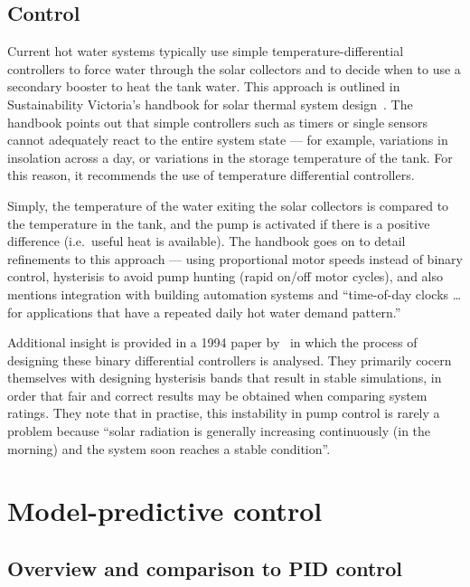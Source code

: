 
\subsection{Control}

Current hot water systems typically use simple temperature-differential controllers to force water through the solar collectors and to decide when to use a secondary booster to heat the tank water.
This approach is outlined in Sustainability Victoria's handbook for solar thermal system design~\cite{LSTS}.
The handbook points out that simple controllers such as timers or single sensors cannot adequately react to the entire system state --- for example, variations in insolation across a day, or variations in the storage temperature of the tank.
For this reason, it recommends the use of temperature differential controllers.

Simply, the temperature of the water exiting the solar collectors is compared to the temperature in the tank, and the pump is activated if there is a positive difference (i.e.\ useful heat is available).
The handbook goes on to detail refinements to this approach --- using proportional motor speeds instead of binary control, hysterisis to avoid pump hunting (rapid on/off motor cycles), and also mentions integration with building automation systems and ``time-of-day clocks \ldots for applications that have a repeated daily hot water demand pattern.''

Additional insight is provided in a 1994 paper by~\textcite{Beckman94} in which the process of designing these binary differential controllers is analysed.
They primarily cocern themselves with designing hysterisis bands that result in stable simulations, in order that fair and correct results may be obtained when comparing system ratings.
They note that in practise, this instability in pump control is rarely a problem because ``solar radiation is generally increasing continuously (in the morning) and the system soon reaches a stable condition''.

\section{Model-predictive control}

\subsection{Overview and comparison to PID control}

